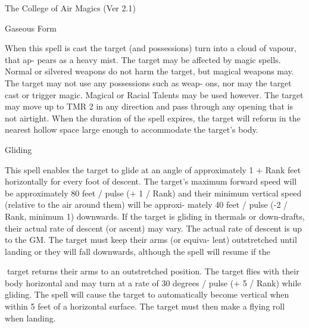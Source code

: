 \begin{Chapter}{The College of Air Magics (Ver 2.1)}
\begin{spell}[S-7]{Gaseous Form }
\begin{effects}
 When  this  spell  is  cast  the  target  (and 
possessions)  turn  into  a  cloud  of  vapour,  that  ap-
pears  as  a  heavy  mist.  The  target  may  be  affected 
by  magic  spells.  Normal  or  silvered  weapons  do 
not harm the target, but magical weapons may. The 
target  may  not  use  any  possessions  such  as  weap-
ons,  nor  may  the  target  cast  or  trigger  magic. 
Magical  or  Racial  Talents  may  be  used  however. 
The target may move up to TMR 2 in any direction 
and  pass  through  any  opening  that  is  not  airtight. 
When  the  duration  of  the  spell  expires,  the  target 
will  reform  in  the  nearest  hollow  space  large 
enough to accommodate the target’s body. 

\end{effects}
\end{spell}

\begin{spell}[S-8]{Gliding }

\begin{effects}
This spell  enables the target to glide at an 
angle  of  approximately  1  + Rank  feet  horizontally 
for  every  foot  of  descent.  The  target’s  maximum 
forward speed will be approximately 80 feet / pulse 
(+  1  /  Rank)  and  their  minimum  vertical  speed 
(relative  to  the  air  around  them)  will  be  approxi-
mately  40  feet  /  pulse  (-2  /  Rank,  minimum  1) 
downwards.  If  the  target  is  gliding  in  thermals  or 
down-drafts, their actual rate of descent (or ascent) 
may  vary.  The  actual  rate  of  descent  is  up  to  the 
GM.  The  target  must  keep  their  arms  (or  equiva-
lent)  outstretched  until  landing  or  they  will  fall 
downwards,  although  the  spell  will  resume  if  the 

target returns their arms to an outstretched position. 
The target flies with their body horizontal and may 
turn  at  a  rate  of  30  degrees  /  pulse  (+  5  /  Rank) 
while  gliding.  The  spell  will  cause  the  target  to 
automatically  become  vertical  when  within  5  feet 
of a horizontal surface. The target must then make 
a flying roll when landing. 


\end{effects}
\end{spell}
\end{Chapter}

